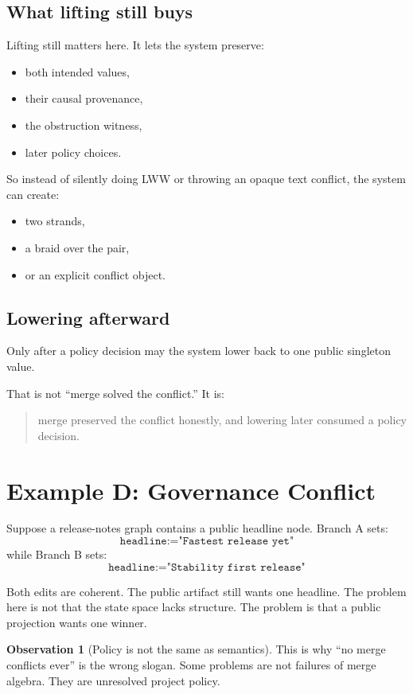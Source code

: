 \documentclass[11pt]{article}
\theoremstyle{definition}
\newtheorem{observation}{Observation}
\begin{document}
\subsection{What lifting still buys}

Lifting still matters here. It lets the system preserve:
\begin{itemize}[leftmargin=2em]
\item both intended values,
\item their causal provenance,
\item the obstruction witness,
\item later policy choices.
\end{itemize}

So instead of silently doing LWW or throwing an opaque text conflict, the
system can create:
\begin{itemize}[leftmargin=2em]
\item two strands,
\item a braid over the pair,
\item or an explicit conflict object.
\end{itemize}

\subsection{Lowering afterward}

Only after a policy decision may the system lower back to one public singleton
value.

That is not ``merge solved the conflict.'' It is:
\begin{quote}
merge preserved the conflict honestly, and lowering later consumed a policy
decision.
\end{quote}

\section{Example D: Governance Conflict}

Suppose a release-notes graph contains a public headline node. Branch A sets:
\[
\texttt{headline} := \texttt{"Fastest release yet"}
\]
while Branch B sets:
\[
\texttt{headline} := \texttt{"Stability first release"}
\]

Both edits are coherent. The public artifact still wants one headline. The
problem here is not that the state space lacks structure. The problem is that a
public projection wants one winner.

\begin{observation}[Policy is not the same as semantics]
This is why ``no merge conflicts ever'' is the wrong slogan. Some problems are
not failures of merge algebra. They are unresolved project policy.
\end{observation}
\end{document}
